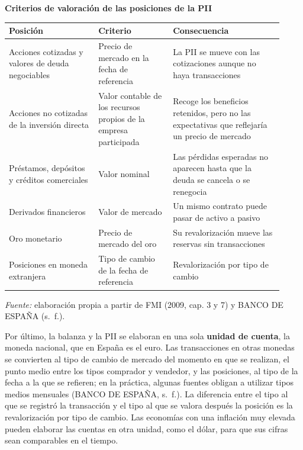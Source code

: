 \documentclass[10pt,a4paper]{article}
\begin{document}
\begin{center}\begin{minipage}{\linewidth}\centering
{\small\textbf{Criterios de valoración de las posiciones de la PII}}\par\vspace{0.3em}
\footnotesize
\begin{tabular}{p{0.30\linewidth}p{0.25\linewidth}p{0.37\linewidth}}
\hline
Posición & Criterio & Consecuencia\\
\hline
Acciones cotizadas y valores de deuda negociables & Precio de mercado en la fecha de referencia & La PII se mueve con las cotizaciones aunque no haya transacciones\\
Acciones no cotizadas de la inversión directa & Valor contable de los recursos propios de la empresa participada & Recoge los beneficios retenidos, pero no las expectativas que reflejaría un precio de mercado\\
Préstamos, depósitos y créditos comerciales & Valor nominal & Las pérdidas esperadas no aparecen hasta que la deuda se cancela o se renegocia\\
Derivados financieros & Valor de mercado & Un mismo contrato puede pasar de activo a pasivo\\
Oro monetario & Precio de mercado del oro & Su revalorización mueve las reservas sin transacciones\\
Posiciones en moneda extranjera & Tipo de cambio de la fecha de referencia & Revalorización por tipo de cambio\\
\hline
\end{tabular}\par\vspace{0.3em}
{\small\textit{Fuente: }elaboración propia a partir de FMI (2009, cap. 3 y 7) y BANCO DE ESPAÑA (s.~f.).}
\end{minipage}\end{center}

Por último, la balanza y la PII se elaboran en una sola \textbf{unidad de cuenta}, la moneda nacional, que en España es el euro. Las transacciones en otras monedas se convierten al tipo de cambio de mercado del momento en que se realizan, el punto medio entre los tipos comprador y vendedor, y las posiciones, al tipo de la fecha a la que se refieren; en la práctica, algunas fuentes obligan a utilizar tipos medios mensuales (BANCO DE ESPAÑA, s.~f.). La diferencia entre el tipo al que se registró la transacción y el tipo al que se valora después la posición es la revalorización por tipo de cambio. Las economías con una inflación muy elevada pueden elaborar las cuentas en otra unidad, como el dólar, para que sus cifras sean comparables en el tiempo.
\end{document}
